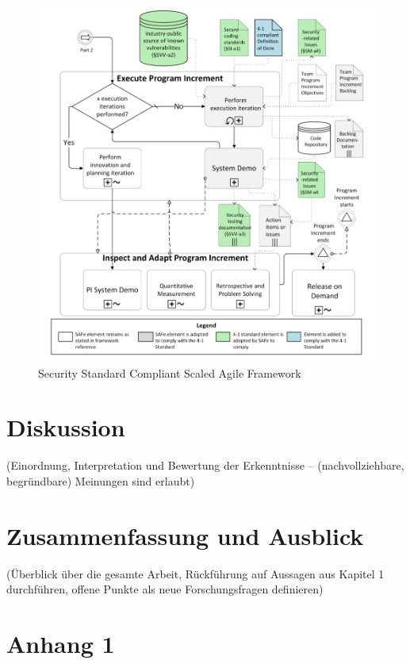 \documentclass[acmtog]{acmart}
\begin{document}
\begin{figure}
  \centering
  \includegraphics[width=0.9\linewidth]{images/S2C.png}
  \caption{Security Standard Compliant Scaled Agile Framework}
  \label{fig:s2c}
\end{figure}











\section{Diskussion}

(Einordnung, Interpretation und Bewertung der Erkenntnisse -- (nachvollziehbare, begründbare) Meinungen sind erlaubt) 



\section{Zusammenfassung und Ausblick}

(Überblick über die gesamte Arbeit, Rückführung auf Aussagen aus Kapitel 1 durchführen, offene Punkte als neue Forschungsfragen definieren)






\appendix

\section{Anhang 1}
\end{document}
